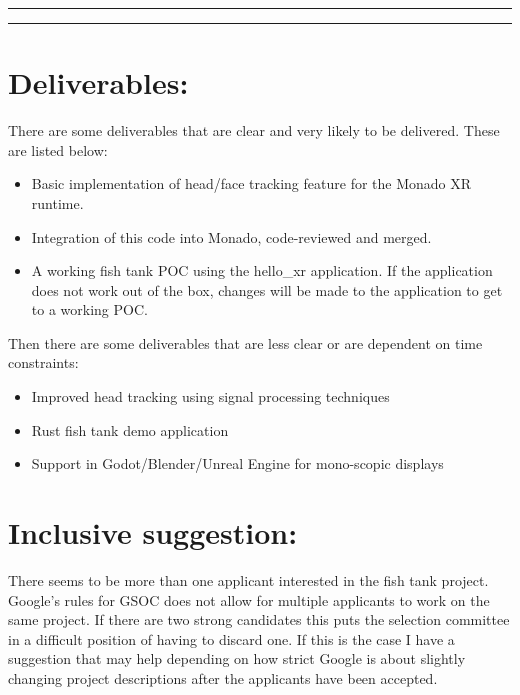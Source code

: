 \begin{normalsize}
\begin{table}[H]
\centering
\begin{minipage}[t]{.7\linewidth}
\rule{\linewidth}{1pt}
\bigskip
\rule{\linewidth}{1pt}%
\end{minipage}%
\end{table}

\section{Deliverables:}

There are some deliverables that are clear and very likely to be delivered. These
are listed below:

\begin{itemize}
\item Basic implementation of head/face tracking feature for the Monado XR runtime.
\item Integration of this code into Monado, code-reviewed and merged.
\item A working fish tank POC using the hello\_xr application. If the
application does not work out of the box, changes will be made to the application
to get to a working POC.
\end{itemize}

\noindent
Then there are some deliverables that are less clear or are dependent on time
constraints:

\begin{itemize}
\item Improved head tracking using signal processing techniques
\item Rust fish tank demo application
\item Support in Godot/Blender/Unreal Engine for mono-scopic displays
\end{itemize}

\section{Inclusive suggestion:}

There seems to be more than one applicant interested in the fish tank project.
Google's rules for GSOC does not allow for multiple applicants to work on the same
project. If there are two strong candidates this puts the selection committee in a
difficult position of having to discard one. If this is the case I have a
suggestion that may help depending on how strict Google is about slightly changing
project descriptions after the applicants have been accepted.


\end{normalsize}
